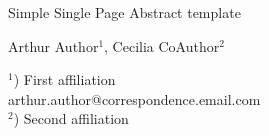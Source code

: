 
	
	\Large
	\begin{center}
		Simple Single Page Abstract template\\ 
		
		\hspace{10pt}
		
		\large
		Arthur Author$^1$, Cecilia CoAuthor$^2$ \\
		
		\hspace{10pt}
		
		\small  
		$^1$) First affiliation\\
		arthur.author@correspondence.email.com\\
		$^2$) Second affiliation
		
	\end{center}
	
	\hspace{10pt}
	
	\normalsize
	
